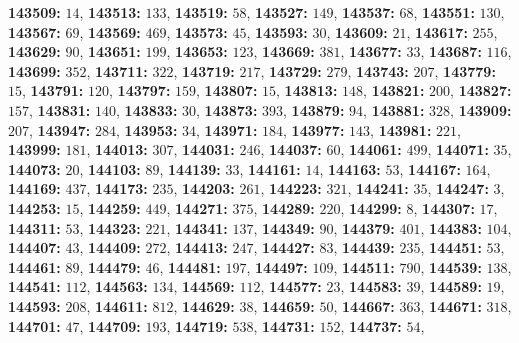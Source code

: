 \textsf{\bfseries 143509:} $14$, \textsf{\bfseries 143513:} $133$, \textsf{\bfseries 143519:} $58$, \textsf{\bfseries 143527:} $149$, \textsf{\bfseries 143537:} $68$, \textsf{\bfseries 143551:} $130$, \textsf{\bfseries 143567:} $69$, \textsf{\bfseries 143569:} $469$, \textsf{\bfseries 143573:} $45$, \textsf{\bfseries 143593:} $30$, \textsf{\bfseries 143609:} $21$, \textsf{\bfseries 143617:} $255$, \textsf{\bfseries 143629:} $90$, \textsf{\bfseries 143651:} $199$, \textsf{\bfseries 143653:} $123$, \textsf{\bfseries 143669:} $381$, \textsf{\bfseries 143677:} $33$, \textsf{\bfseries 143687:} $116$, \textsf{\bfseries 143699:} $352$, \textsf{\bfseries 143711:} $322$, \textsf{\bfseries 143719:} $217$, \textsf{\bfseries 143729:} $279$, \textsf{\bfseries 143743:} $207$, \textsf{\bfseries 143779:} $15$, \textsf{\bfseries 143791:} $120$, \textsf{\bfseries 143797:} $159$, \textsf{\bfseries 143807:} $15$, \textsf{\bfseries 143813:} $148$, \textsf{\bfseries 143821:} $200$, \textsf{\bfseries 143827:} $157$, \textsf{\bfseries 143831:} $140$, \textsf{\bfseries 143833:} $30$, \textsf{\bfseries 143873:} $393$, \textsf{\bfseries 143879:} $94$, \textsf{\bfseries 143881:} $328$, \textsf{\bfseries 143909:} $207$, \textsf{\bfseries 143947:} $284$, \textsf{\bfseries 143953:} $34$, \textsf{\bfseries 143971:} $184$, \textsf{\bfseries 143977:} $143$, \textsf{\bfseries 143981:} $221$, \textsf{\bfseries 143999:} $181$, \textsf{\bfseries 144013:} $307$, \textsf{\bfseries 144031:} $246$, \textsf{\bfseries 144037:} $60$, \textsf{\bfseries 144061:} $499$, \textsf{\bfseries 144071:} $35$, \textsf{\bfseries 144073:} $20$, \textsf{\bfseries 144103:} $89$, \textsf{\bfseries 144139:} $33$, \textsf{\bfseries 144161:} $14$, \textsf{\bfseries 144163:} $53$, \textsf{\bfseries 144167:} $164$, \textsf{\bfseries 144169:} $437$, \textsf{\bfseries 144173:} $235$, \textsf{\bfseries 144203:} $261$, \textsf{\bfseries 144223:} $321$, \textsf{\bfseries 144241:} $35$, \textsf{\bfseries 144247:} $3$, \textsf{\bfseries 144253:} $15$, \textsf{\bfseries 144259:} $449$, \textsf{\bfseries 144271:} $375$, \textsf{\bfseries 144289:} $220$, \textsf{\bfseries 144299:} $8$, \textsf{\bfseries 144307:} $17$, \textsf{\bfseries 144311:} $53$, \textsf{\bfseries 144323:} $221$, \textsf{\bfseries 144341:} $137$, \textsf{\bfseries 144349:} $90$, \textsf{\bfseries 144379:} $401$, \textsf{\bfseries 144383:} $104$, \textsf{\bfseries 144407:} $43$, \textsf{\bfseries 144409:} $272$, \textsf{\bfseries 144413:} $247$, \textsf{\bfseries 144427:} $83$, \textsf{\bfseries 144439:} $235$, \textsf{\bfseries 144451:} $53$, \textsf{\bfseries 144461:} $89$, \textsf{\bfseries 144479:} $46$, \textsf{\bfseries 144481:} $197$, \textsf{\bfseries 144497:} $109$, \textsf{\bfseries 144511:} $790$, \textsf{\bfseries 144539:} $138$, \textsf{\bfseries 144541:} $112$, \textsf{\bfseries 144563:} $134$, \textsf{\bfseries 144569:} $112$, \textsf{\bfseries 144577:} $23$, \textsf{\bfseries 144583:} $39$, \textsf{\bfseries 144589:} $19$, \textsf{\bfseries 144593:} $208$, \textsf{\bfseries 144611:} $812$, \textsf{\bfseries 144629:} $38$, \textsf{\bfseries 144659:} $50$, \textsf{\bfseries 144667:} $363$, \textsf{\bfseries 144671:} $318$, \textsf{\bfseries 144701:} $47$, \textsf{\bfseries 144709:} $193$, \textsf{\bfseries 144719:} $538$, \textsf{\bfseries 144731:} $152$, \textsf{\bfseries 144737:} $54$, 
